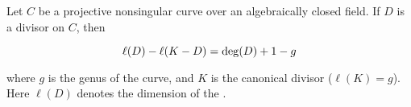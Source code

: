 \documentclass{article}
\begin{document}
Let $C$ be a projective nonsingular curve over an algebraically closed field.  If $D$ is a divisor on $C$, then

$$\ell(D) - \ell(K-D) = {\rm deg}(D) + 1 - g$$

where $g$ is the genus of the curve, and $K$ is the canonical divisor ($\ell(K)=g$).  Here $\ell(D)$ denotes the dimension of the .
\end{document}
